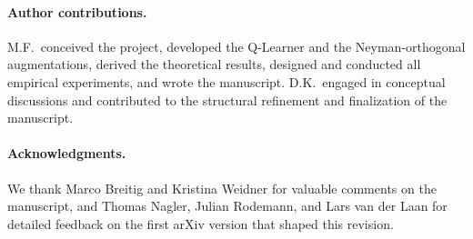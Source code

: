 \documentclass{article}
\begin{document}
\paragraph{Author contributions.}

M.F.\ conceived the project, developed the Q-Learner and the Neyman-orthogonal augmentations, derived the theoretical results, designed and conducted all empirical experiments, and wrote the manuscript. D.K.\ engaged in conceptual discussions and contributed to the structural refinement and finalization of the manuscript.

\paragraph{Acknowledgments.}
We thank Marco Breitig and Kristina Weidner for valuable comments on
the manuscript, and Thomas Nagler, Julian Rodemann, and Lars van der
Laan for detailed feedback on the first arXiv version that shaped
this revision.

\end{document}
